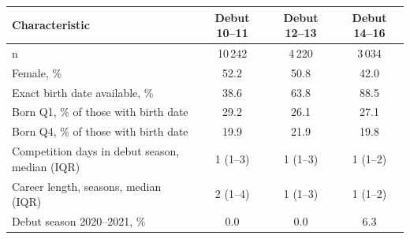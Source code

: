 \begin{tabular}{lccc}
\toprule
Characteristic & Debut 10--11 & Debut 12--13 & Debut 14--16 \\
\midrule
n & 10\,242 & 4\,220 & 3\,034 \\
Female, \% & 52.2 & 50.8 & 42.0 \\
Exact birth date available, \% & 38.6 & 63.8 & 88.5 \\
Born Q1, \% of those with birth date & 29.2 & 26.1 & 27.1 \\
Born Q4, \% of those with birth date & 19.9 & 21.9 & 19.8 \\
Competition days in debut season, median (IQR) & 1 (1--3) & 1 (1--3) & 1 (1--2) \\
Career length, seasons, median (IQR) & 2 (1--4) & 1 (1--3) & 1 (1--2) \\
Debut season 2020--2021, \% & 0.0 & 0.0 & 6.3 \\
\bottomrule
\end{tabular}
